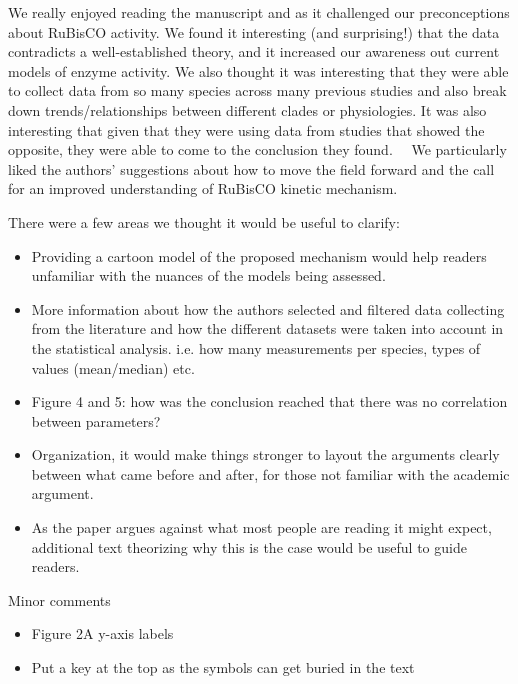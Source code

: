 \documentclass[10pt]{article}
\providecommand{\tightlist}{\setlength{\itemsep}{0pt}\setlength{\parskip}{0pt}}%
\begin{document}
\par\null

We really enjoyed reading the manuscript and as it challenged our
preconceptions about RuBisCO activity. We found it interesting (and
surprising!) that the data contradicts a well-established theory, and it
increased our awareness out current models of enzyme activity. We also
thought it was interesting that they were able to collect data from so
many species across many previous studies and also break down
trends/relationships between different clades or physiologies. It was
also interesting that given that they were using data from studies that
showed the opposite, they were able to come to the conclusion they
found. ~~We particularly liked the authors' suggestions about how to
move the field forward and the call for an improved understanding of
RuBisCO kinetic mechanism.

\par\null

There were a few areas we thought it would be useful to clarify:

\begin{itemize}
\tightlist
\item
  Providing a cartoon model of the proposed mechanism would help readers
  unfamiliar with the nuances of the models being assessed.
\item
  More information about how the authors selected and filtered data
  collecting from the literature and how the different datasets were
  taken into account in the statistical analysis. i.e. how many
  measurements per species, types of values (mean/median) etc.
\item
  Figure 4 and 5: how was the conclusion reached that there was no
  correlation between parameters?
\item
  Organization, it would make things stronger to layout the arguments
  clearly between what came before and after, for those not familiar
  with the academic argument.
\item
  As the paper argues against what most people are reading it might
  expect, additional text theorizing why this is the case would be
  useful to guide readers.
\end{itemize}

Minor comments

\begin{itemize}
\tightlist
\item
  Figure 2A y-axis labels
\item
  Put a key at the top as the symbols can get buried in the text
\end{itemize}

\par\null

\textbf{}

\FloatBarrier
\end{document}
